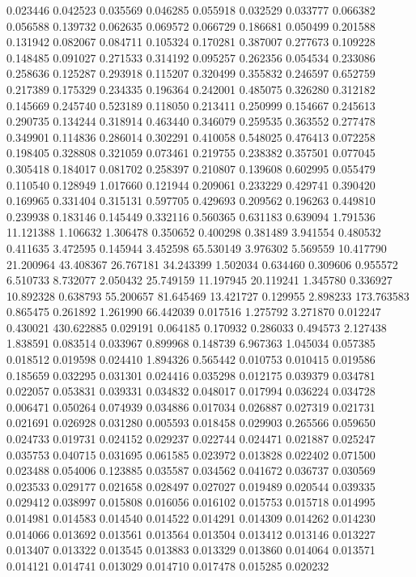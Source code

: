 0.023446
0.042523
0.035569
0.046285
0.055918
0.032529
0.033777
0.066382
0.056588
0.139732
0.062635
0.069572
0.066729
0.186681
0.050499
0.201588
0.131942
0.082067
0.084711
0.105324
0.170281
0.387007
0.277673
0.109228
0.148485
0.091027
0.271533
0.314192
0.095257
0.262356
0.054534
0.233086
0.258636
0.125287
0.293918
0.115207
0.320499
0.355832
0.246597
0.652759
0.217389
0.175329
0.234335
0.196364
0.242001
0.485075
0.326280
0.312182
0.145669
0.245740
0.523189
0.118050
0.213411
0.250999
0.154667
0.245613
0.290735
0.134244
0.318914
0.463440
0.346079
0.259535
0.363552
0.277478
0.349901
0.114836
0.286014
0.302291
0.410058
0.548025
0.476413
0.072258
0.198405
0.328808
0.321059
0.073461
0.219755
0.238382
0.357501
0.077045
0.305418
0.184017
0.081702
0.258397
0.210807
0.139608
0.602995
0.055479
0.110540
0.128949
1.017660
0.121944
0.209061
0.233229
0.429741
0.390420
0.169965
0.331404
0.315131
0.597705
0.429693
0.209562
0.196263
0.449810
0.239938
0.183146
0.145449
0.332116
0.560365
0.631183
0.639094
1.791536
11.121388
1.106632
1.306478
0.350652
0.400298
0.381489
3.941554
0.480532
0.411635
3.472595
0.145944
3.452598
65.530149
3.976302
5.569559
10.417790
21.200964
43.408367
26.767181
34.243399
1.502034
0.634460
0.309606
0.955572
6.510733
8.732077
2.050432
25.749159
11.197945
20.119241
1.345780
0.336927
10.892328
0.638793
55.200657
81.645469
13.421727
0.129955
2.898233
173.763583
0.865475
0.261892
1.261990
66.442039
0.017516
1.275792
3.271870
0.012247
0.430021
430.622885
0.029191
0.064185
0.170932
0.286033
0.494573
2.127438
1.838591
0.083514
0.033967
0.899968
0.148739
6.967363
1.045034
0.057385
0.018512
0.019598
0.024410
1.894326
0.565442
0.010753
0.010415
0.019586
0.185659
0.032295
0.031301
0.024416
0.035298
0.012175
0.039379
0.034781
0.022057
0.053831
0.039331
0.034832
0.048017
0.017994
0.036224
0.034728
0.006471
0.050264
0.074939
0.034886
0.017034
0.026887
0.027319
0.021731
0.021691
0.026928
0.031280
0.005593
0.018458
0.029903
0.265566
0.059650
0.024733
0.019731
0.024152
0.029237
0.022744
0.024471
0.021887
0.025247
0.035753
0.040715
0.031695
0.061585
0.023972
0.013828
0.022402
0.071500
0.023488
0.054006
0.123885
0.035587
0.034562
0.041672
0.036737
0.030569
0.023533
0.029177
0.021658
0.028497
0.027027
0.019489
0.020544
0.039335
0.029412
0.038997
0.015808
0.016056
0.016102
0.015753
0.015718
0.014995
0.014981
0.014583
0.014540
0.014522
0.014291
0.014309
0.014262
0.014230
0.014066
0.013692
0.013561
0.013564
0.013504
0.013412
0.013146
0.013227
0.013407
0.013322
0.013545
0.013883
0.013329
0.013860
0.014064
0.013571
0.014121
0.014741
0.013029
0.014710
0.017478
0.015285
0.020232
